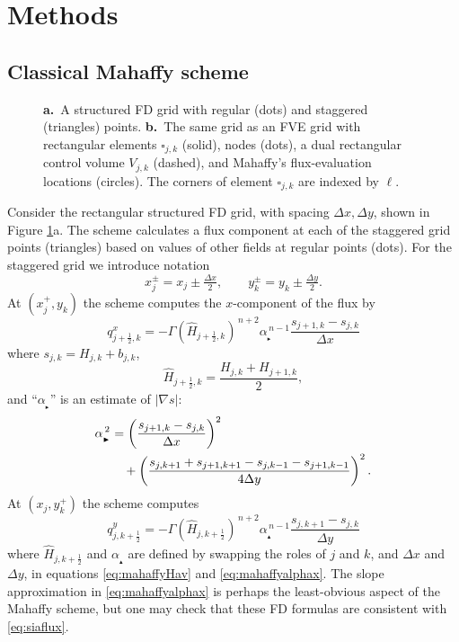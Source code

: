 \documentclass[twocolumn,a4paper]{igs}
\newcommand{\grad}{\nabla}
\newcommand\alpharight{\alpha_{{}_{\blacktriangleright}}}
\newcommand\alphaup{\alpha_{{\!}_{\blacktriangle}}}
\newcommand{\dxtwo}{\tfrac{\Delta x}{2}}
\newcommand{\dytwo}{\tfrac{\Delta y}{2}}
\newcommand{\half}{\tfrac{1}{2}}
\begin{document}
\section{Methods}

\subsection{Classical Mahaffy scheme}

\begin{figure}[ht]
\begin{center}
 \quad 
\end{center}
\caption{\textbf{a.}~A structured FD grid with regular (dots) and staggered (triangles) points.  \textbf{b.}~The same grid as an FVE grid with rectangular elements $\square_{j,k}$ (solid), nodes (dots), a dual rectangular control volume $V_{j,k}$ (dashed), and Mahaffy's flux-evaluation locations (circles).  The corners of element $\square_{j,k}$ are indexed by $\ell$.}
\label{fig:fdfemgrids}
\end{figure}

Consider the rectangular structured FD grid, with spacing $\Delta x,\Delta y$, shown in Figure \ref{fig:fdfemgrids}a.  The \cite{Mahaffy1976} scheme calculates a flux component at each of the staggered grid points (triangles) based on values of other fields at regular points (dots).  For the staggered grid we introduce notation
\begin{equation}
x_j^\pm = x_j \pm \dxtwo, \qquad y_k^\pm = y_k \pm \dytwo. \label{eq:definexypm}
\end{equation}
At $(x_j^+,y_k)$ the scheme computes the $x$-component of the flux by
\begin{equation}
q^x_{j+\half,k} = - \Gamma (\hat H_{j+\half,k})^{\,n+2} \alpharight^{\,n-1} \frac{s_{j+1,k} - s_{j,k}}{\Delta x}  \label{eq:mahaffyqx}
\end{equation}
where $s_{j,k} = H_{j,k} + b_{j,k}$,
\begin{equation}
  \hat H_{j+\half,k} = \frac{H_{j,k} + H_{j+1,k}}{2},  \label{eq:mahaffyHav}
\end{equation}
and ``$\alpharight$\!'' is an estimate of $|\grad s|$:
\begin{align}
\alpharight^{\,2} &= \left(\frac{s_{j+1,k} - s_{j,k}}{\Delta x}\right)^2  \label{eq:mahaffyalphax} \\
  &\quad + \left(\frac{s_{j,k+1} + s_{j+1,k+1} - s_{j,k-1} - s_{j+1,k-1}}{4 \Delta y}\right)^2. \notag
\end{align}
At $(x_j,y_k^+)$ the scheme computes
\begin{equation}
q^y_{j,k+\half} = - \Gamma (\hat H_{j,k+\half})^{\,n+2} \alphaup^{\,n-1} \frac{s_{j,k+1} - s_{j,k}}{\Delta y}  \label{eq:mahaffyqy}
\end{equation}
where $\hat H_{j,k+\half}$ and $\alphaup$ are defined by swapping the roles of $j$ and $k$, and $\Delta x$ and $\Delta y$, in equations \eqref{eq:mahaffyHav} and \eqref{eq:mahaffyalphax}.  The slope approximation in \eqref{eq:mahaffyalphax} is perhaps the least-obvious aspect of the Mahaffy scheme, but one may check that these FD formulas are consistent \citep{MortonMayers2005} with \eqref{eq:siaflux}.
\end{document}
